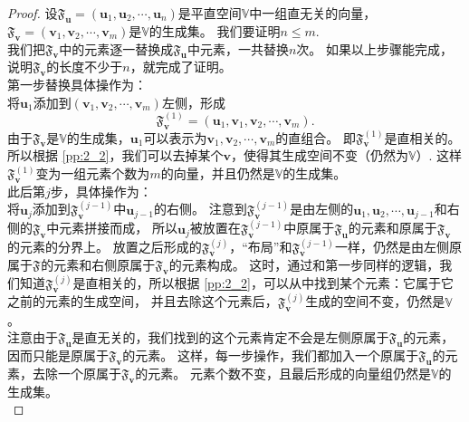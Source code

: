 \documentclass[12pt,UTF8,fontset=none]{ctexbook}
\begin{document}
\begin{appendix}
\begin{proof}
    设$\mathfrak{F}_{\mathbf{u}} = (\mathbf{u}_1, \mathbf{u}_2, \cdots , \mathbf{u}_n )$是平直空间$\mathbb{V}$中一组直无关的向量，
    $\mathfrak{F}_{\mathbf{v}} = (\mathbf{v}_1, \mathbf{v}_2, \cdots , \mathbf{v}_m )$是$\mathbb{V}$的生成集。
    我们要证明$n \leq m$. \\    
    我们把$\mathfrak{F}_{\mathbf{v}}$中的元素逐一替换成$\mathfrak{F}_{\mathbf{u}}$中元素，一共替换$n$次。
    如果以上步骤能完成，说明$\mathfrak{F}_{\mathbf{v}}$的长度不少于$n$，就完成了证明。\\    
    第一步替换具体操作为：\\    
    将$\mathbf{u}_1$添加到$(\mathbf{v}_1, \mathbf{v}_2, \cdots , \mathbf{v}_m )$左侧，形成
    $$\mathfrak{F}_{\mathbf{v}}^{(1)} = (\mathbf{u}_1, \mathbf{v}_1, \mathbf{v}_2, \cdots , \mathbf{v}_m ).$$
    由于$\mathfrak{F}_{\mathbf{v}}$是$\mathbb{V}$的生成集，$\mathbf{u}_1$可以表示为$\mathbf{v}_1, \mathbf{v}_2, \cdots , \mathbf{v}_m$的直组合。
    即$\mathfrak{F}_{\mathbf{v}}^{(1)}$是直相关的。所以根据 \ref{pp:2_2}，我们可以去掉某个$\mathbf{v}$，使得其生成空间不变（仍然为$\mathbb{V}$）.
    这样$\mathfrak{F}_{\mathbf{v}}^{(1)}$变为一组元素个数为$m$的向量，并且仍然是$\mathbb{V}$的生成集。\\
    此后第$j$步，具体操作为：\\
    将$\mathbf{u}_j$添加到$\mathfrak{F}_{\mathbf{v}}^{(j-1)}$中$\mathbf{u}_{j-1}$的右侧。
    注意到$\mathfrak{F}_{\mathbf{v}}^{(j-1)}$是由左侧的$\mathbf{u}_1, \mathbf{u}_2, \cdots , \mathbf{u}_{j-1}$和右侧的$\mathfrak{F}_{\mathbf{v}}$中元素拼接而成，
    所以$\mathbf{u}_j$被放置在$\mathfrak{F}_{\mathbf{v}}^{(j-1)}$中原属于$\mathfrak{F}_{\mathbf{u}}$的元素和原属于$\mathfrak{F}_{\mathbf{v}}$的元素的分界上。
    放置之后形成的$\mathfrak{F}_{\mathbf{v}}^{(j)}$，“布局”和$\mathfrak{F}_{\mathbf{v}}^{(j-1)}$一样，仍然是由左侧原属于$\mathfrak{F}_{\mathbf{}}$的元素和右侧原属于$\mathfrak{F}_{\mathbf{v}}$的元素构成。
    这时，通过和第一步同样的逻辑，我们知道$\mathfrak{F}_{\mathbf{v}}^{(j)}$是直相关的，所以根据 \ref{pp:2_2}，可以从中找到某个元素：它属于它之前的元素的生成空间，
    并且去除这个元素后，$\mathfrak{F}_{\mathbf{v}}^{(j)}$生成的空间不变，仍然是$\mathbb{V}$。\\
    注意由于$\mathfrak{F}_{\mathbf{u}}$是直无关的，我们找到的这个元素肯定不会是左侧原属于$\mathfrak{F}_{\mathbf{u}}$的元素，因而只能是原属于$\mathfrak{F}_{\mathbf{v}}$的元素。
    这样，每一步操作，我们都加入一个原属于$\mathfrak{F}_{\mathbf{u}}$的元素，去除一个原属于$\mathfrak{F}_{\mathbf{v}}$的元素。
    元素个数不变，且最后形成的向量组仍然是$\mathbb{V}$的生成集。\\

\end{proof}
\end{appendix}
\end{document}
